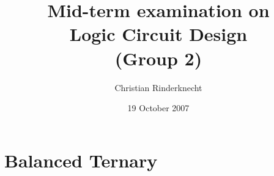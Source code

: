 \documentclass[11pt,a4paper]{article}
\title{Mid-term examination on\\ Logic Circuit Design\\ (Group 2)}
\author{Christian Rinderknecht}
\date{19 October 2007}
\begin{document}
\maketitle
\thispagestyle{empty}

\allowdisplaybreaks

\section{Balanced Ternary}






\end{document}
